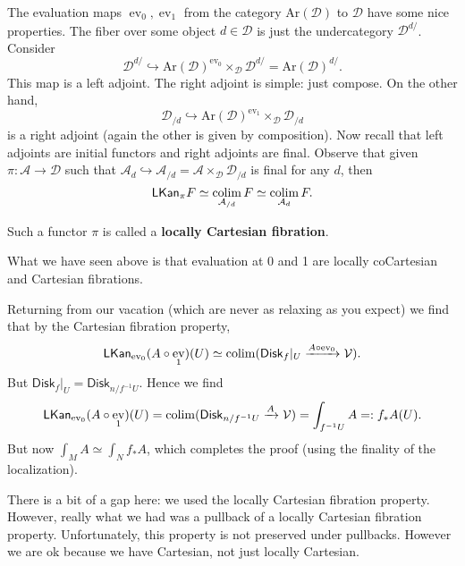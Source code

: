 \documentclass{amsart}
\DeclareMathOperator{\ev}{ev}
\begin{document}
The evaluation maps $\ev_0,\ev_1$ from the category $\text{Ar}(\mathcal{D})$ to $\mathcal{D}$
have some nice properties. The fiber over some object $d\in \mathcal{D}$ is just the undercategory
$\mathcal{D}^{d/}$. Consider
\begin{equation*}
    \mathcal{D}^{d/} \hookrightarrow \text{Ar}(\mathcal{D})^{\ev_0}\times_{\mathcal{D}}\mathcal{D}^{d/} = \text{Ar}(\mathcal{D})^{d/}.
\end{equation*}
This map is a left adjoint. The right adjoint is simple: just compose.
On the other hand,
\begin{equation*}
    \mathcal{D}_{/d}\hookrightarrow \text{Ar}(\mathcal{D})^{\ev_1}\times_\mathcal{D}\mathcal{D}_{/d}
\end{equation*}
is a right adjoint (again the other is given by composition).
Now recall that left adjoints are initial functors and right adjoints are final.
Observe that given $\pi:\mathcal{A}\to \mathcal{D}$ such that $\mathcal{A}_d\hookrightarrow \mathcal{A}_{/d}=\mathcal{A}\times_\mathcal{D}\mathcal{D}_{/d}$
is final for any $d$, then
\begin{equation*}
    \mathsf{LKan}_\pi F \simeq \operatorname*{colim}_{\mathcal{A}_{/d}} F \simeq \operatorname*{colim}_{\mathcal{A}_d} F.
\end{equation*}
\begin{definition}
    Such a functor $\pi$ is called a \textbf{locally Cartesian fibration}.
\end{definition}
What we have seen above is that evaluation at 0 and 1 are locally coCartesian and Cartesian fibrations.

Returning from our vacation (which are never as relaxing as you expect) we find that
by the Cartesian fibration property,
\begin{equation*}
    \mathsf{LKan}_{\ev_0}(A\circ \ev_1)(U) \simeq \colim(\mathsf{Disk}_f|_{U}\xrightarrow{A\circ \ev_0} \mathcal{V}).
\end{equation*}
But $\mathsf{Disk}_f|_{U}=\mathsf{Disk}_{n/f^{-1}U}$. Hence we find
\begin{equation*}
    \mathsf{LKan}_{\ev_0}(A\circ \ev_1)(U)=\colim (\mathsf{Disk}_{n/f^{-1}U}\xrightarrow{A} \mathcal{V}) = \int_{f^{-1}U} A =: f_*A(U).
\end{equation*}
But now $\int_M A\simeq \int_N f_*A$, which completes the proof (using the finality of the localization).

There is a bit of a gap here: we used the locally Cartesian fibration property. However, really what
we had was a pullback of a locally Cartesian fibration property. Unfortunately, this property is not
preserved under pullbacks. However we are ok because we have Cartesian, not just locally Cartesian.
\end{document}
